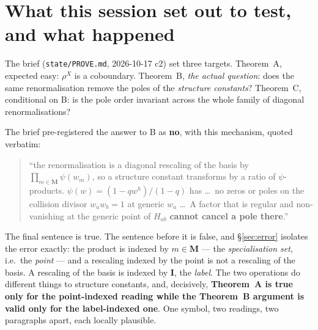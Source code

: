 \documentclass[11pt]{article}
\theoremstyle{plain}
\theoremstyle{definition}
\theoremstyle{remark}
\theoremstyle{plain}
\newcommand{\bI}{\mathbf{I}}
\newcommand{\bM}{\mathbf{M}}
\begin{document}
\begin{abstract}
Consequences.  (i) Q491's criterion ``$c^\nu_{\lambda\mu}$ Laurent $\iff$
$|\nu|-\max(|\lambda|,|\mu|)\le1$'' is a property of the
$\mathcal{E}^C$-normalised basis, \textbf{not} of the algebra: under $\psi$ it
becomes vacuous.  The negative half of Q500 --- a ``Pfaffian-category
obstruction'' read off the non-Laurentness --- is withdrawn in the form in which
I stated it.  (ii) What survives, and is the right invariant, is \emph{not} the
pole but the \emph{class}: the poles are removable because $\rho$ is a
coboundary, and had $\rho$ not split as $\varphi(w_a)\varphi(w_b)$ no
point-diagonal renormalisation could have removed them.  The obstruction I had
been measuring was a cochain.  The class is zero.
\end{abstract}

\tableofcontents

\section{What this session set out to test, and what happened}

The brief (\texttt{state/PROVE.md}, 2026-10-17 c2) set three targets.
Theorem~A, expected easy: $\rho^X$ is a coboundary.  Theorem~B,
\emph{the actual question}: does the same renormalisation remove the poles of
the \emph{structure constants}?  Theorem~C, conditional on B: is the pole order
invariant across the whole family of diagonal renormalisations?

The brief pre-registered the answer to B as \textbf{no}, with this mechanism,
quoted verbatim:

\begin{quote}\small
``the renormalisation is a diagonal rescaling of the basis by
$\prod_{m\in\bM}\psi(w_m)$, so a structure constant transforms by a ratio of
$\psi$-products.  $\psi(w)=(1-qw^h)/(1-q)$ has \dots\ no zeros or poles on the
collision divisor $w_aw_b=1$ at generic $w_a$ \dots\ A factor that is regular and
non-vanishing at the generic point of $H_{ab}$ \textbf{cannot cancel a pole
there}.''
\end{quote}

The final sentence is true.  The sentence before it is false, and
\S\ref{sec:error} isolates the error exactly: the product is indexed by
$m\in\bM$ --- the \emph{specialisation set}, i.e.\ the \emph{point} --- and a
rescaling indexed by the point is not a rescaling of the basis.  A rescaling of
the basis is indexed by $\bI$, the \emph{label}.  The two operations do different
things to structure constants, and, decisively, \textbf{Theorem~A is true only
for the point-indexed reading while the Theorem~B argument is valid only for the
label-indexed one}.  One symbol, two readings, two paragraphs apart, each
locally plausible.
\end{document}
